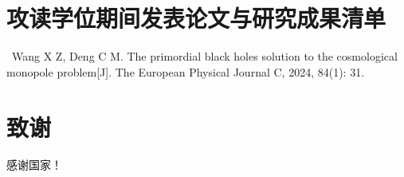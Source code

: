 \documentclass[UTF8,12pt,AutoFakeBold]{ctexart}
\begin{document}
\section*{攻读学位期间发表论文与研究成果清单}

\noindent[1]\ Wang X Z, Deng C M. The primordial black holes solution to the cosmological monopole problem[J]. The European Physical Journal C, 2024, 84(1): 31.
\pagebreak
\section*{致谢}
\fangsong
感谢国家！
\end{document}
